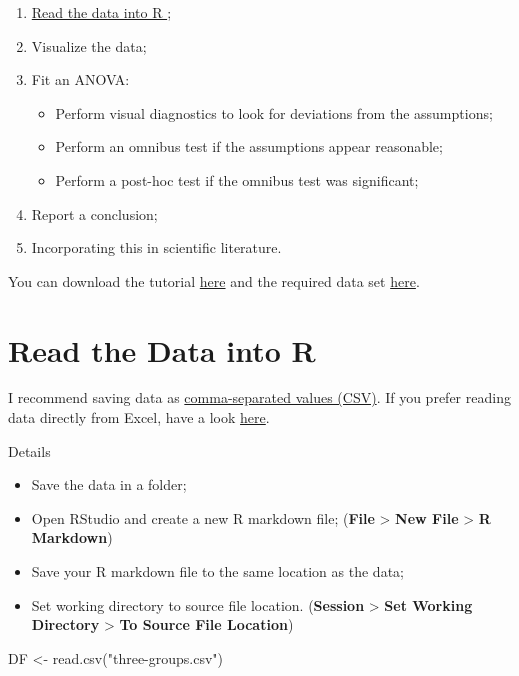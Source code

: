 \documentclass[
]{book}
\newenvironment{Shaded}{\begin{snugshade}}{\end{snugshade}}
\newcommand{\FunctionTok}[1]{\textcolor[rgb]{0.00,0.00,0.00}{#1}}
\newcommand{\NormalTok}[1]{#1}
\newcommand{\OtherTok}[1]{\textcolor[rgb]{0.56,0.35,0.01}{#1}}
\newcommand{\StringTok}[1]{\textcolor[rgb]{0.31,0.60,0.02}{#1}}
\providecommand{\tightlist}{%
  \setlength{\itemsep}{0pt}\setlength{\parskip}{0pt}}
\begin{document}
\begin{enumerate}
\def\labelenumi{\arabic{enumi}.}
\tightlist
\item
  \href{https://youtu.be/BGUqZc-Pb8w}{Read the data into R };
\item
  Visualize the data;
\item
  Fit an ANOVA:

  \begin{itemize}
  \tightlist
  \item
    Perform visual diagnostics to look for deviations from the assumptions;
  \item
    Perform an omnibus test if the assumptions appear reasonable;
  \item
    Perform a post-hoc test if the omnibus test was significant;
  \end{itemize}
\item
  Report a conclusion;
\item
  Incorporating this in scientific literature.
\end{enumerate}

You can download the tutorial \href{files/tutorial_ANOVA.Rmd}{here} and the required data set \href{data/three-groups.csv}{here}.

\hypertarget{read-ANOVA}{%
\section{Read the Data into R}\label{read-ANOVA}}

I recommend saving data as \href{https://youtu.be/BGUqZc-Pb8w}{comma-separated values (CSV)}. If you prefer reading data directly from Excel, have a look \protect\hyperlink{Excel}{here}.

Details

\begin{itemize}
\tightlist
\item
  Save the data in a folder;
\item
  Open RStudio and create a new R markdown file; (\textbf{File} \textgreater{} \textbf{New File} \textgreater{} \textbf{R Markdown})
\item
  Save your R markdown file to the same location as the data;
\item
  Set working directory to source file location. (\textbf{Session} \textgreater{} \textbf{Set Working Directory} \textgreater{} \textbf{To Source File Location})
\end{itemize}

\begin{Shaded}
\begin{Highlighting}[]
\NormalTok{DF }\OtherTok{\textless{}{-}} \FunctionTok{read.csv}\NormalTok{(}\StringTok{"three{-}groups.csv"}\NormalTok{)}
\end{Highlighting}
\end{Shaded}
\end{document}
